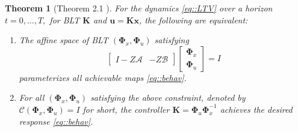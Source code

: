 \documentclass{article}[12pt]
\newtheorem{theorem}{Theorem}
\begin{document}
\begin{theorem}[Theorem 2.1 \cite{anderson2019system}]
\label{thm::achieve}
For the dynamics \eqref{eq::LTV} over a horizon $t=0, \dots, T,$ for BLT $\mathbf{K}$ and $\mathbf{u}=\mathbf{K} \mathbf{x}$, the following are equivalent:
\begin{enumerate}
    \item The affine space of BLT $(\mathbf{\Phi}_{x}, \mathbf{\Phi}_u)$ satisfying 
    \begin{equation}
    \label{eq::affine_constr}
        \left[\begin{array}{cc}{I-Z \mathcal{A}} & {-Z \mathcal{B}}\end{array}\right]\left[\begin{array}{c}{\boldsymbol{\Phi}_{x}} \\ {\mathbf{\Phi}_{u}}\end{array}\right]=I
    \end{equation}
    parameterizes all achievable maps \eqref{eq::behav}.
    \item For all $(\mathbf{\Phi}_{x}, \mathbf{\Phi}_u)$ satisfying the above constraint, denoted by $\mathcal{C}\left(\mathbf{\Phi}_{x}, \mathbf{\Phi}_{u}\right)=I$ for short, the controller $\mathbf{K}=\mathbf{\Phi}_{u} \mathbf{\Phi}_{x}^{-1}$ achieves the desired response \eqref{eq::behav}.
\end{enumerate}
\end{theorem}
\end{document}

